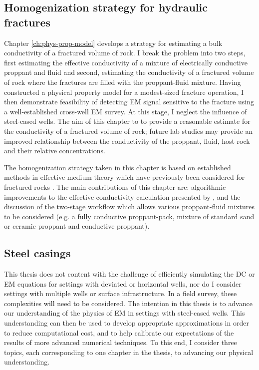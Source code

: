 \subsection{Homogenization strategy for hydraulic fractures}

Chapter \ref{ch:phys-prop-model} develops a strategy for estimating a bulk conductivity of a fractured volume of rock.  I break the problem into two steps, first estimating the effective conductivity of a mixture of electrically conductive proppant and fluid and second, estimating the conductivity of a fractured volume of rock where the fractures are filled with the proppant-fluid mixture. Having constructed a physical property model for a modest-sized fracture operation, I then demonstrate feasibility of detecting EM signal sensitive to the fracture using a well-established cross-well EM survey. At this stage, I neglect the influence of steel-cased wells. The aim of this chapter to to provide a reasonable estimate for the conductivity of a fractured volume of rock; future lab studies may provide an improved relationship between the conductivity of the proppant, fluid, host rock and their relative concentrations.

The homogenization strategy taken in this chapter is based on established methods in effective medium theory \citep{Bruggeman1935} which have previously been considered for fractured rocks \citep{Berryman2013}. The main contributions of this chapter are: algorithmic improvements to the effective conductivity calculation presented by \cite{Berryman2013}, and the discussion of the two-stage workflow which allows various proppant-fluid mixtures to be considered (e.g. a fully conductive proppant-pack, mixture of standard sand or ceramic proppant and conductive proppant).


\subsection{Steel casings}

This thesis does not content with the challenge of efficiently simulating the DC or EM equations for settings with deviated or horizontal wells, nor do I consider settings with multiple wells or surface infrastructure. In a field survey, these complexities will need to be considered. The intention in this thesis is to advance our understanding of the physics of EM in settings with steel-cased wells. This understanding can then be used to develop appropriate approximations in order to reduce computational cost, and to help calibrate our expectations of the results of more advanced numerical techniques. To this end, I consider three topics, each corresponding to one chapter in the thesis, to advancing our physical understanding.

